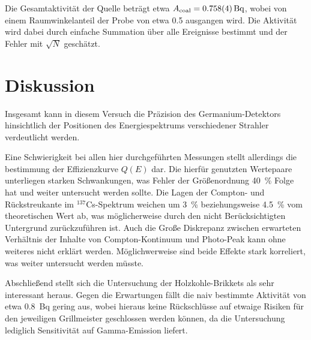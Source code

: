 Die Gesamtaktivität der Quelle beträgt etwa $A_\text{coal} = \SI{0.758+-0.004}{\becquerel}$,
wobei von einem Raumwinkelanteil der Probe von etwa \num{0.5} ausgangen wird.
Die Aktivität wird dabei durch einfache Summation über alle Ereignisse
bestimmt und der Fehler mit $\sqrt{N}$ geschätzt.

\section{Diskussion}
\label{sec:diskussion}
Insgesamt kann in diesem Versuch die Präzision des Germanium-Detektors
hinsichtlich
der Positionen des Energiespektrums verschiedener Strahler verdeutlicht
werden.

Eine Schwierigkeit bei allen hier durchgeführten Messungen stellt allerdings
die bestimmung der Effizienzkurve $Q(E)$ dar.
Die hierfür genutzten Wertepaare unterliegen starken Schwankungen, was Fehler
der Größenordnung \SI{40}{\percent} Folge hat und weiter untersucht werden
sollte.
Die Lagen der Compton- und Rückstreukante im $^{137}$Cs-Spektrum
weichen um \SI{3}{\percent} beziehungsweise \SI{4.5}{\percent}
vom theoretischen Wert ab, was möglicherweise durch den nicht Berücksichtigten
Untergrund zurückzuführen ist.
Auch die Große Diskrepanz zwischen erwarteten Verhältnis der Inhalte von
Compton-Kon\-ti\-nu\-um und Photo-Peak kann ohne weiteres nicht erklärt werden.
Möglichwerweise sind beide Effekte stark korreliert, was weiter untersucht
werden müsste.

Abschließend stellt sich die Untersuchung der Holzkohle-Brikkets als sehr
interessant heraus. Gegen die Erwartungen fällt die naiv bestimmte Aktivität
von etwa \SI{0.8}{\becquerel} gering aus, wobei hieraus keine Rückschlüsse auf
etwaige Risiken für den jeweiligen Grillmeister geschlossen werden können,
da die Untersuchung lediglich Sensitivität auf Gamma-Emission liefert.
